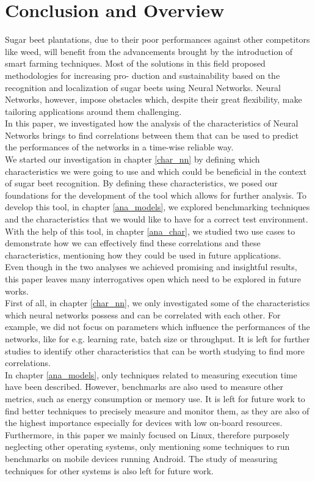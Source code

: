 \chapter{Conclusion and Overview}

Sugar beet plantations, due to their poor performances against other competitors like weed, will benefit from the advancements brought by the introduction of smart farming techniques. Most of the solutions in this field proposed methodologies for increasing pro- duction and sustainability based on the recognition and localization of sugar beets using Neural Networks. Neural Networks, however, impose obstacles which, despite their great flexibility, make tailoring applications around them challenging.\\
In this paper, we investigated how the analysis of the characteristics of Neural Networks brings to find correlations between them that can be used to predict the performances of the networks in a time-wise reliable way.\\
We started our investigation in chapter \ref{char_nn} by defining which characteristics we were going to use and which could be beneficial in the context of sugar beet recognition. By defining these characteristics, we posed our foundations for the development of the tool which allows for further analysis. To develop this tool, in chapter \ref{ana_models}, we explored benchmarking techniques and the characteristics that we would like to have for a correct test environment. With the help of this tool, in chapter \ref{ana_char},  we studied two use cases to demonstrate how we can effectively find these correlations and these characteristics, mentioning how they could be used in future applications. \\
Even though in the two analyses we achieved promising and insightful results, this paper leaves many interrogatives open which need to be explored in future works. \\
First of all, in chapter \ref{char_nn}, we only investigated some of the characteristics which neural networks possess and can be correlated with each other. For example, we did not focus on parameters which influence the performances of the networks, like for e.g. learning rate, batch size or throughput. It is left for further studies to identify other characteristics that can be worth studying to find more correlations.\\
In chapter \ref{ana_models}, only techniques related to measuring execution time have been described. However, benchmarks are also used to measure other metrics, such as energy consumption or memory use. It is left for future work to find better techniques to precisely measure and monitor them, as they are also of the highest importance especially for devices with low on-board resources. Furthermore, in this paper we mainly focused on Linux, therefore purposely neglecting other operating systems, only mentioning some techniques to run benchmarks on mobile devices running Android. The study of measuring techniques for other systems is also left for future work. \\
